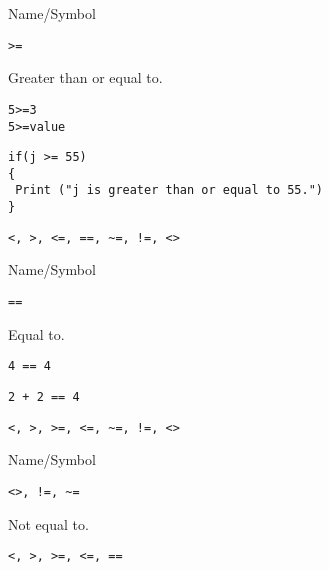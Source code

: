 \rl

\begin{desc}{Name/Symbol}

\item[Name/Symbol] 	\verb+>=+                   

\item[Description] 	Greater than or equal to.

\item[Usage]
\begin{verbatim}
5>=3  
5>=value
\end{verbatim}

\item[Example]
\begin{verbatim}
if(j >= 55)
{
 Print ("j is greater than or equal to 55.")
}
\end{verbatim}

\item[See Also]     	\verb+<, >, <=, ==, ~=, !=, <>+
\end{desc}

\rl

\begin{desc}{Name/Symbol}

\item[Name/Symbol] 	\verb+==+                   

\item[Description] 	Equal to.

\item[Usage]       	\verb+4 == 4+
		

\item[Example]
\begin{verbatim}
2 + 2 == 4
\end{verbatim}

\item[See Also]     	\verb+<, >, >=, <=, ~=, !=, <>+
\end{desc}

\rl

\begin{desc}{Name/Symbol}
\item[Name/Symbol]  	\verb+<>, !=, ~=+

\item[Description]  	Not equal to.

\item[Usage]		

\item[Example]	

\item[See Also]     	\verb+<, >, >=, <=, ==+

\end{desc}

